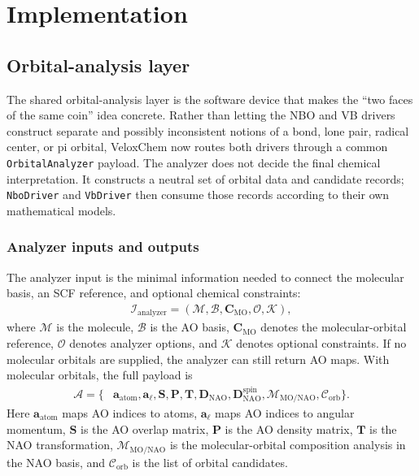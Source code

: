 \documentclass[11pt]{article}
\newcommand{\nao}{\mathrm{NAO}}
\newcommand{\dens}{\mathbf{D}}
\begin{document}
\section{Implementation}

\subsection{Orbital-analysis layer}

The shared orbital-analysis layer is the software device that makes the ``two faces of the same coin'' idea concrete.  Rather than letting the NBO and VB drivers construct separate and possibly inconsistent notions of a bond, lone pair, radical center, or pi orbital, VeloxChem now routes both drivers through a common \texttt{OrbitalAnalyzer} payload.  The analyzer does not decide the final chemical interpretation.  It constructs a neutral set of orbital data and candidate records; \texttt{NboDriver} and \texttt{VbDriver} then consume those records according to their own mathematical models.

\subsubsection*{Analyzer inputs and outputs}

The analyzer input is the minimal information needed to connect the molecular basis, an SCF reference, and optional chemical constraints:
\begin{equation}
\begin{aligned}
	\mathcal{I}_{\mathrm{analyzer}}
	= \left(\mathcal{M},\mathcal{B},\mathbf{C}_{\mathrm{MO}},\mathcal{O},\mathcal{K}\right),
\end{aligned}
\end{equation}
where $\mathcal{M}$ is the molecule, $\mathcal{B}$ is the AO basis, $\mathbf{C}_{\mathrm{MO}}$ denotes the molecular-orbital reference, $\mathcal{O}$ denotes analyzer options, and $\mathcal{K}$ denotes optional constraints.  If no molecular orbitals are supplied, the analyzer can still return AO maps.  With molecular orbitals, the full payload is
\begin{equation}
\begin{aligned}
	\mathcal{A}
	= \{&\mathbf{a}_{\mathrm{atom}},
	\mathbf{a}_{\ell},
	\mathbf{S},
	\mathbf{P},
	\mathbf{T},
	\dens_{\nao},
	\dens^{\mathrm{spin}}_{\nao},
	\mathcal{M}_{\mathrm{MO/NAO}},
	\mathcal{C}_{\mathrm{orb}}\}.
\end{aligned}
\end{equation}
Here $\mathbf{a}_{\mathrm{atom}}$ maps AO indices to atoms, $\mathbf{a}_{\ell}$ maps AO indices to angular momentum, $\mathbf{S}$ is the AO overlap matrix, $\mathbf{P}$ is the AO density matrix, $\mathbf{T}$ is the NAO transformation, $\mathcal{M}_{\mathrm{MO/NAO}}$ is the molecular-orbital composition analysis in the NAO basis, and $\mathcal{C}_{\mathrm{orb}}$ is the list of orbital candidates.
\end{document}
